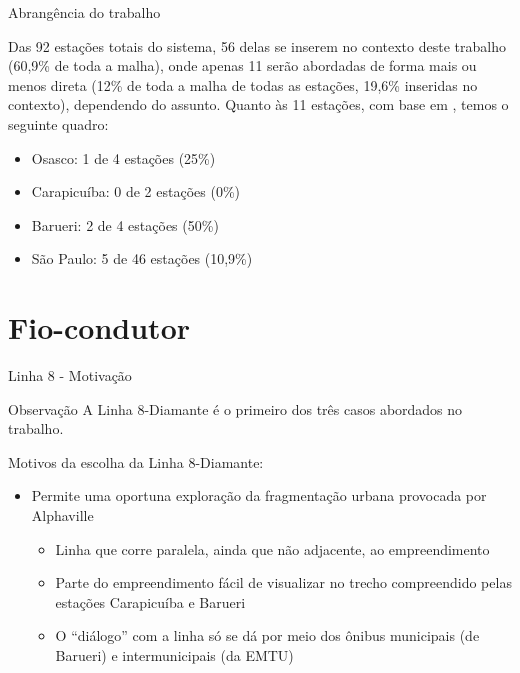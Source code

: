 \documentclass[spectratio=169, portuguese]{beamer}
\begin{document}
\begin{frame}{Abrangência do trabalho}
	
	Das 92 estações totais do sistema, 56 delas se inserem no contexto deste trabalho (60,9\% de toda a malha), onde apenas 11 serão abordadas de forma mais ou menos direta (12\% de toda a malha de todas as estações, 19,6\% inseridas no contexto), dependendo do assunto. Quanto às 11 estações, com base em , temos o seguinte quadro:
	
	\begin{itemize}
		\item Osasco: 1 de 4 estações (25\%)
		\item Carapicuíba: 0 de 2 estações (0\%)
		\item Barueri: 2 de 4 estações (50\%)
		\item São Paulo: 5 de 46 estações (10,9\%)
	\end{itemize}

\end{frame}

\section{Fio-condutor}

\begin{frame}{Linha 8 - Motivação}

	\begin{block}{Observação}
		A Linha 8-Diamante é o primeiro dos três casos abordados no trabalho.
	\end{block}

	\vspace*{1cm} 
	
	Motivos da escolha da Linha 8-Diamante:

	\begin{itemize}
		\item Permite uma oportuna exploração da fragmentação urbana provocada por Alphaville
			\begin{itemize}
				\item Linha que corre paralela, ainda que não adjacente, ao empreendimento
				\item Parte do empreendimento fácil de visualizar no trecho compreendido pelas estações Carapicuíba e Barueri	
				\item O ``diálogo'' com a linha só se dá por meio dos ônibus municipais (de Barueri) e intermunicipais (da EMTU)
			\end{itemize}
	\end{itemize}

\end{frame}
\end{document}
